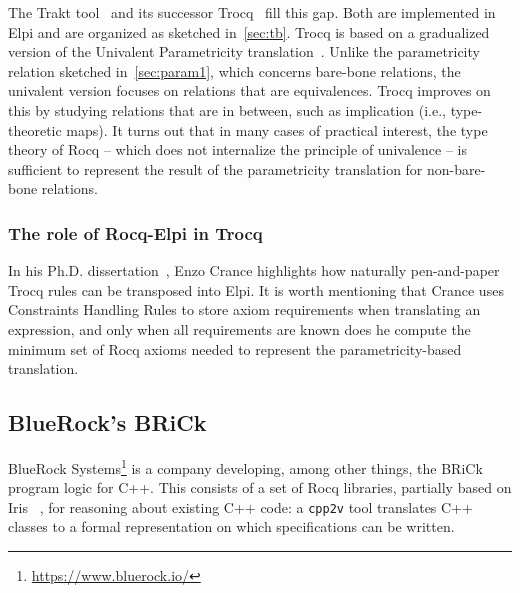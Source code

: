 \documentclass{these-ISSS}
\begin{document}
The Trakt tool~\cite{DBLP:conf/cpp/Blot0CPKMV23} and its successor
Trocq~\cite{10.1007/978-3-031-57262-3_10} fill this gap. Both are implemented
in Elpi and are organized as sketched in~\cref{sec:tb}. Trocq is based on a
gradualized version of the Univalent Parametricity
translation~\cite{10.1145/3429979}. Unlike the parametricity relation
sketched in~\cref{sec:param1}, which concerns bare-bone relations, the
univalent version focuses on relations that are equivalences. Trocq improves
on this by studying relations that are in between, such as implication (i.e.,
type-theoretic maps). It turns out that in many cases of practical interest,
the type theory of Rocq -- which does not internalize the principle of
univalence -- is sufficient to represent the result of the parametricity
translation for non-bare-bone relations.

\subsubsection{The role of Rocq-Elpi in Trocq}

In his Ph.D. dissertation~\cite[Page 115]{enzo}, Enzo Crance highlights how naturally
pen-and-paper Trocq rules can be transposed into Elpi. It is worth mentioning
that Crance uses Constraints Handling Rules to store axiom requirements when
translating an expression, and only when all requirements are known does he
compute the minimum set of Rocq axioms needed to represent the
parametricity-based translation.



\subsection{BlueRock's BRiCk}


BlueRock Systems\footnote{\url{https://www.bluerock.io/}} is a company
developing, among other things, the BRiCk program logic for C++. This consists
of a set of Rocq libraries, partially based on Iris
~\cite{10.1145/2676726.2676980,10.1007/978-3-662-54434-1_26}, for reasoning
about existing C++ code: a \texttt{cpp2v} tool translates C++ classes to a
formal representation on which specifications can be written.
\end{document}
